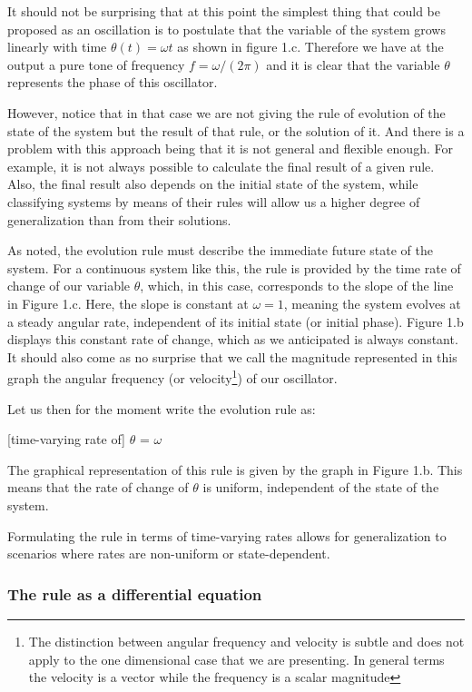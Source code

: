 \documentclass{article}
\begin{document}
It should not be surprising that at this point the simplest thing that could be proposed as an oscillation is to postulate that the variable of the system grows linearly with time $\theta(t)=\omega t$ as shown in figure 1.c.  Therefore we have at the output a pure tone of frequency $f=\omega/(2\pi)$ and it is clear that the variable $\theta$ represents the phase of this oscillator.

However, notice that in that case we are not giving the rule of evolution of the state of the system but the result of that rule, or the solution of it. 
And there is a problem with this approach being that it is not general and flexible enough. 
For example, it is not always possible to calculate the final result of a given rule. 
Also, the final result also depends on the initial state of the system, while classifying systems by means of their rules will allow us a higher degree of generalization than from their solutions.

As noted, the evolution rule must describe the immediate future state of the system. 
For a continuous system like this, the rule is provided by the time rate of change of our variable $\theta$, which, in this case, corresponds to the slope of the line in Figure 1.c. 
Here, the slope is constant at $\omega=1$, meaning the system evolves at a steady angular rate, independent of its initial state (or initial phase). Figure 1.b displays this constant rate of change, which as we anticipated is always constant. 
It should also come as no surprise that we call the magnitude represented in this graph the angular frequency (or velocity\footnote{The distinction between angular frequency and velocity is subtle and does not apply to the one dimensional case that we are presenting. In general terms the velocity is a vector while the frequency is a scalar magnitude}) of our oscillator.

Let us then for the moment write the evolution rule as: 

[time-varying rate of] $\theta$ = $\omega$

The graphical representation of this rule is given by the graph in Figure 1.b. This means that the rate of change of $\theta$ is uniform, independent of the state of the system. 

Formulating the rule in terms of time-varying rates allows for generalization to scenarios where rates are non-uniform or state-dependent.

\subsubsection{The rule as a differential equation}
\end{document}
